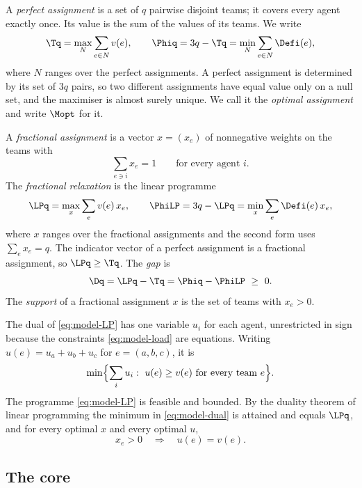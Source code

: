 A \emph{perfect assignment} is a set of $q$ pairwise disjoint teams; it covers every agent
exactly once. Its value is the sum of the values of its teams. We write
\begin{equation}\label{eq:model-T}
\Tq=\max_N\sum_{e\in N}v(e),\qquad
\Phiq=3q-\Tq=\min_N\sum_{e\in N}\Defi(e),
\end{equation}
where $N$ ranges over the perfect assignments.
A perfect assignment is determined by its set of $3q$ pairs, so two different assignments have
equal value only on a null set, and the maximiser is almost surely unique. We call it the
\emph{optimal assignment} and write $\Mopt$ for it.

A \emph{fractional assignment} is a vector $x=(x_e)$ of nonnegative weights on the teams with
\begin{equation}\label{eq:model-load}
\sum_{e\ni i}x_e=1\qquad\text{for every agent } i .
\end{equation}
The \emph{fractional relaxation} is the linear programme
\begin{equation}\label{eq:model-LP}
\LPq=\max_x\sum_e v(e)\,x_e,\qquad
\PhiLP=3q-\LPq=\min_x\sum_e\Defi(e)\,x_e ,
\end{equation}
where $x$ ranges over the fractional assignments and the second form uses $\sum_e x_e=q$. The indicator vector of a perfect assignment is a
fractional assignment, so $\LPq\ge\Tq$. The \emph{gap} is
\begin{equation}\label{eq:model-gap}
\Dq=\LPq-\Tq=\Phiq-\PhiLP\ \ge\ 0 .
\end{equation}
The \emph{support} of a fractional assignment $x$ is the set of teams with $x_e>0$.

The dual of \eqref{eq:model-LP} has one variable $u_i$ for each agent, unrestricted in sign
because the constraints \eqref{eq:model-load} are equations. Writing $u(e)=u_a+u_b+u_c$ for
$e=(a,b,c)$, it is
\begin{equation}\label{eq:model-dual}
\min\Bigl\{\sum_i u_i:\ u(e)\ge v(e)\text{ for every team } e\Bigr\}.
\end{equation}
The programme \eqref{eq:model-LP} is feasible and bounded. By the duality theorem of linear
programming the minimum in \eqref{eq:model-dual} is attained and equals $\LPq$, and for every
optimal $x$ and every optimal $u$,
\begin{equation}\label{eq:model-cs}
x_e>0\quad\Longrightarrow\quad u(e)=v(e).
\end{equation}

\subsection{The core}\label{sec:model-core}

